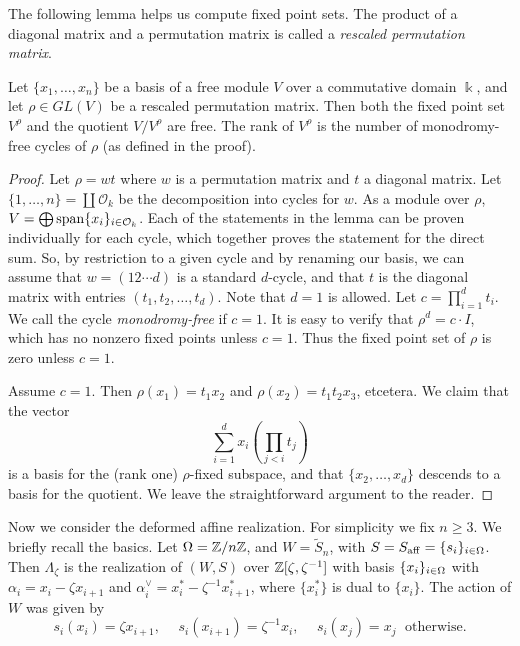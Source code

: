 The following lemma helps us compute fixed point sets. The product of a diagonal matrix and a permutation matrix is called a \emph{rescaled permutation matrix}.

\begin{lemma}\label{lemma rescaled permutation matrix fixed points} Let $\{x_1, \ldots, x_n\}$ be a basis of a free module $V$ over a commutative domain $\Bbbk$, and let $\rho \in GL(V)$ be a rescaled permutation matrix. Then both  the  fixed point set $V^{\rho}$ and the quotient $V/V^{\rho}$ are free. The rank of $V^{\rho}$ is the number of monodromy-free cycles of $\rho$ (as defined in the proof). \end{lemma}

\begin{proof} Let $\rho = w t$ where $w$ is a permutation matrix and $t$ a diagonal matrix. Let $\{1, \ldots, n\} = \coprod \mathcal{O}_k$ be the decomposition into cycles for $w$. As a module over $\rho$, $V = \bigoplus \operatorname{span} \{x_i\}_{i \in \mathcal{O}_k}$. Each of the statements in the lemma can be proven individually for each cycle, which together proves the statement for the direct sum.
So, by restriction to a given cycle and by renaming our basis, we can assume that $w = (12 \cdots d)$ is a standard $d$-cycle, and that $t$ is the diagonal matrix with entries $(t_1, t_2, \ldots, t_d)$. 
Note that $d=1$ is allowed. Let $c = \prod_{i=1}^d t_i$. We call the cycle \emph{monodromy-free} if $c=1$. It is easy to verify that $\rho^d = c \cdot I$, which has no nonzero fixed points unless $c = 1$. Thus the fixed point set of $\rho$ is zero unless $c=1$.

Assume $c=1$. Then $\rho(x_1) = t_1 x_2$ and $\rho(x_2) = t_1 t_2 x_3$, etcetera. 
We claim that the vector
\[ \sum_{i=1}^d x_i(\prod_{j<i} t_j)\]
is a basis for the (rank one) $\rho$-fixed subspace, and that $\{x_2, \ldots, x_d\}$ descends to a basis for the quotient. We leave the straightforward argument to the reader. 
\end{proof}

Now we consider the deformed affine realization. For simplicity we fix $n \geq 3.$
We briefly recall the basics. 
Let $\Omega =\mathbb{Z}/n\mathbb{Z}$, and $W = \tilde{S}_n$, with $S = S_{\operatorname{aff}} = \{s_i\}_{i \in \Omega}$. Then
$\Lambda_{\zeta}$ is the realization of $(W,S)$ over $\mathbb{Z}[\zeta, \zeta^{-1}]$ with basis $\{x_i\}_{i \in \Omega}$ with $\alpha_i=x_i - \zeta x_{i+1}$ and $\alpha_i^\vee= x_i^*- \zeta^{-1}x_{i+1}^*$, where $\{x_{i}^*\}$ is dual to $\{ x_i\}$. 
The action of $W$ was given by
$$ s_i(x_i)=\zeta x_{i+1}, \hspace{15pt} s_i(x_{i+1})=\zeta^{-1}x_i, \hspace{15pt} s_i(x_j)=x_j \;\text{  otherwise.}$$


